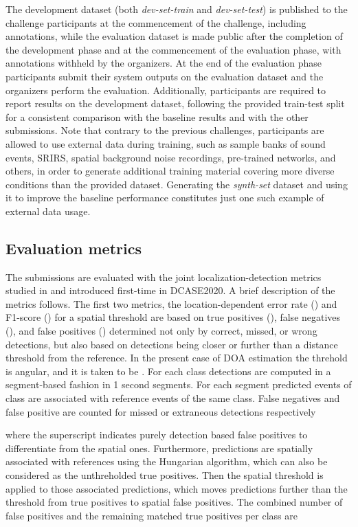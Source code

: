 \documentclass{article}
\begin{document}
\begin{sloppy}
The development dataset (both \emph{dev-set-train} and \emph{dev-set-test}) is published to the challenge participants at the commencement of the challenge, including annotations, while the evaluation dataset is made public after the completion of the development phase and at the commencement of the evaluation phase, with annotations withheld by the organizers. At the end of the evaluation phase participants submit their system outputs on the evaluation dataset and the organizers perform the evaluation.
Additionally, participants are required to report results on the development dataset, following the provided train-test split for a consistent comparison with the baseline results and with the other submissions. Note that contrary to the previous challenges, participants are allowed to use external data during training, such as sample banks of sound events, SRIRS, spatial background noise recordings, pre-trained networks, and others, in order to generate additional training material covering more diverse conditions than the provided dataset. Generating the \emph{synth-set} dataset and using it to improve the baseline performance constitutes just one such example of external data usage. 




\subsection{Evaluation metrics}

The submissions are evaluated with the joint localization-detection metrics studied in \cite{mesaros2019joint, politis2020overview} and introduced first-time in DCASE2020. A brief description of the metrics follows. The first two metrics, the location-dependent error rate () and F1-score () for a spatial threshold  are based on true positives (), false negatives (), and false positives () determined not only by correct, missed, or wrong detections, but also based on detections being closer or further than a distance threshold  from the reference. In the present case of DOA estimation the threhold is angular, and it is taken to be . For each class  detections are computed in a segment-based fashion \cite{mesaros2016metrics} in 1 second segments. For each segment  predicted events of class  are associated with  reference events of the same class. False negatives and false positive are counted for missed or extraneous detections respectively

where the  superscript indicates purely detection based false positives to differentiate from the spatial ones. Furthermore, 
 predictions are spatially associated with references using the Hungarian algorithm, which can also be considered as the unthreholded true positives. Then the spatial threshold is applied to those associated predictions, which moves  predictions further than the threshold from true positives to spatial false positives. The combined number of false positives and the remaining matched true positives per class are


\end{sloppy}
\end{document}
